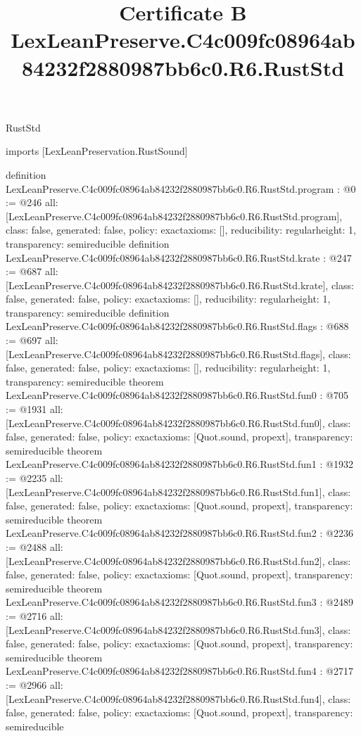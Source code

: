\begin{lexlean}{RustStd}
\title{Certificate B LexLeanPreserve.C4c009fc08964ab84232f2880987bb6c0.R6.RustStd}
\begin{coremodule}
imports [LexLeanPreservation.RustSound]

definition LexLeanPreserve.C4c009fc08964ab84232f2880987bb6c0.R6.RustStd.program : @0 := @246 {
  all: [LexLeanPreserve.C4c009fc08964ab84232f2880987bb6c0.R6.RustStd.program],
  class: false,
  generated: false,
  policy: exact{axioms: []},
  reducibility: regular{height: 1},
  transparency: semireducible
}
definition LexLeanPreserve.C4c009fc08964ab84232f2880987bb6c0.R6.RustStd.krate : @247 := @687 {
  all: [LexLeanPreserve.C4c009fc08964ab84232f2880987bb6c0.R6.RustStd.krate],
  class: false,
  generated: false,
  policy: exact{axioms: []},
  reducibility: regular{height: 1},
  transparency: semireducible
}
definition LexLeanPreserve.C4c009fc08964ab84232f2880987bb6c0.R6.RustStd.flags : @688 := @697 {
  all: [LexLeanPreserve.C4c009fc08964ab84232f2880987bb6c0.R6.RustStd.flags],
  class: false,
  generated: false,
  policy: exact{axioms: []},
  reducibility: regular{height: 1},
  transparency: semireducible
}
theorem LexLeanPreserve.C4c009fc08964ab84232f2880987bb6c0.R6.RustStd.fun0 : @705 := @1931 {
  all: [LexLeanPreserve.C4c009fc08964ab84232f2880987bb6c0.R6.RustStd.fun0],
  class: false,
  generated: false,
  policy: exact{axioms: [Quot.sound, propext]},
  transparency: semireducible
}
theorem LexLeanPreserve.C4c009fc08964ab84232f2880987bb6c0.R6.RustStd.fun1 : @1932 := @2235 {
  all: [LexLeanPreserve.C4c009fc08964ab84232f2880987bb6c0.R6.RustStd.fun1],
  class: false,
  generated: false,
  policy: exact{axioms: [Quot.sound, propext]},
  transparency: semireducible
}
theorem LexLeanPreserve.C4c009fc08964ab84232f2880987bb6c0.R6.RustStd.fun2 : @2236 := @2488 {
  all: [LexLeanPreserve.C4c009fc08964ab84232f2880987bb6c0.R6.RustStd.fun2],
  class: false,
  generated: false,
  policy: exact{axioms: [Quot.sound, propext]},
  transparency: semireducible
}
theorem LexLeanPreserve.C4c009fc08964ab84232f2880987bb6c0.R6.RustStd.fun3 : @2489 := @2716 {
  all: [LexLeanPreserve.C4c009fc08964ab84232f2880987bb6c0.R6.RustStd.fun3],
  class: false,
  generated: false,
  policy: exact{axioms: [Quot.sound, propext]},
  transparency: semireducible
}
theorem LexLeanPreserve.C4c009fc08964ab84232f2880987bb6c0.R6.RustStd.fun4 : @2717 := @2966 {
  all: [LexLeanPreserve.C4c009fc08964ab84232f2880987bb6c0.R6.RustStd.fun4],
  class: false,
  generated: false,
  policy: exact{axioms: [Quot.sound, propext]},
  transparency: semireducible
}
\end{coremodule}
\end{lexlean}
